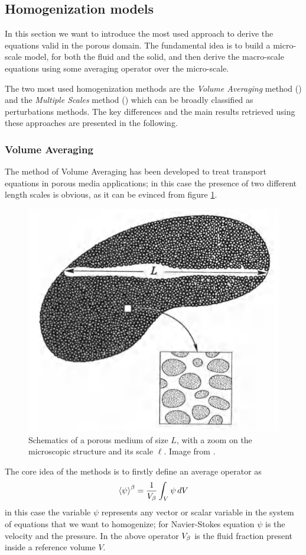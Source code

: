 \subsection{Homogenization models}

In this section we want to introduce the most used approach to derive the equations valid in the porous domain.
The fundamental idea is to build a micro-scale model, for both the fluid and the solid, and then derive the macro-scale equations using some averaging operator over the micro-scale.

The two most used homogenization methods are the \textit{Volume Averaging} method (\citet{whitaker2013method}) and the \textit{Multiple Scales} method (\citet{mei2010homogenization}) which can be broadly classified as perturbations methods. 
The key differences and the main results retrieved using these approaches are presented in the following.


\subsubsection{Volume Averaging}
\label{sec:vans}

The method of Volume Averaging has been developed to treat transport equations in porous media applications; in this case the presence of two different length scales is obvious, as it can be evinced from figure \ref{fig:porsystem}.
	
	\begin{figure}[h]
		\centering
		\includegraphics[width=0.5\linewidth]{chapter_1/por_system}
		\caption{Schematics of a porous medium of size $L$, with a zoom on the microscopic structure and its scale $\ell$. Image from \citet{whitaker2013method}.}
		\label{fig:porsystem}
	\end{figure}

The core idea of the methods is to firstly define an average operator as $${\left< \psi \right>}^{\beta} = \dfrac{1}{V_\beta} \displaystyle\int_{V} \psi \, dV$$ in this case the variable $\psi$ represents any vector or scalar variable in the system of equations that we want to homogenize; for Navier-Stokes equation $\psi$ is the velocity and the pressure. In the above operator $V_\beta$ is the fluid fraction present inside a reference volume $V$.

